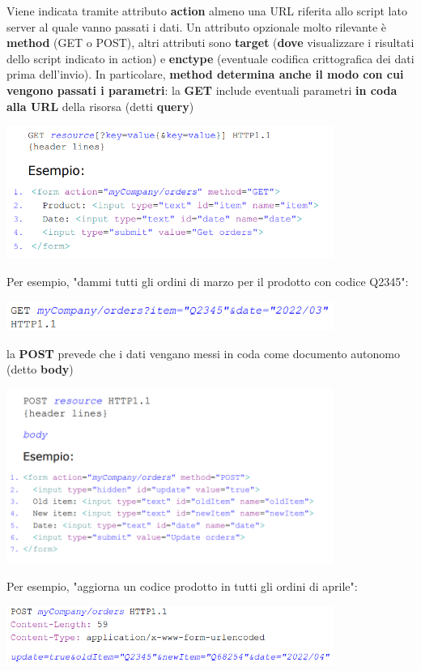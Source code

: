 \documentclass[12pt]{article}
\begin{document}
Viene indicata tramite attributo \textbf{action} almeno una URL riferita allo script lato server al quale vanno passati i dati.
Un attributo opzionale molto rilevante è \textbf{method} (GET o POST), altri attributi sono \textbf{target} (\textbf{dove} visualizzare i risultati dello script indicato in action)
e \textbf{enctype} (eventuale codifica crittografica dei dati prima dell'invio). \newline
In particolare, \textbf{method determina anche il modo con cui vengono passati i parametri}: \newline
la \textbf{GET} include eventuali parametri \textbf{in coda alla URL} della risorsa (detti \textbf{query})
\begin{center}
    \includegraphics[width = 0.80\textwidth]{Images/167.PNG}
\end{center}
Per esempio, "dammi tutti gli ordini di marzo per il prodotto con
codice Q2345":
\begin{center}
    \includegraphics[width = 0.80\textwidth]{Images/168.PNG}
\end{center}
la \textbf{POST} prevede che i dati vengano messi in coda come documento autonomo (detto \textbf{body})
\begin{center}
    \includegraphics[width = 0.80\textwidth]{Images/169.PNG}
\end{center}
Per esempio, "aggiorna un codice prodotto in tutti gli ordini di aprile":
\begin{center}
    \includegraphics[width = 0.80\textwidth]{Images/170.PNG}
\end{center}
\end{document}

